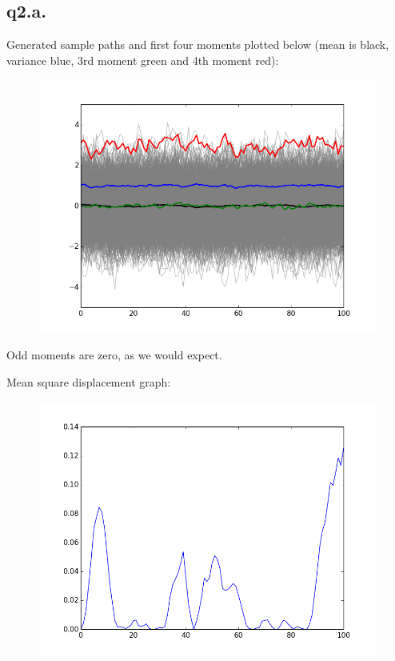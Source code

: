 \documentclass[11pt]{article} %
\begin{document}
\subsection{q2.a.}
Generated sample paths and first four moments plotted below (mean is black, variance blue, 3rd moment green and 4th moment red):

\begin{figure}
	\centering
		\includegraphics[scale = 0.5]{q2a.png}
\end{figure}

Odd moments are zero, as we would expect.

Mean square displacement graph:

\begin{figure}[h!]
	\centering
		\includegraphics{q2rms.png}
\end{figure}
\end{document}
